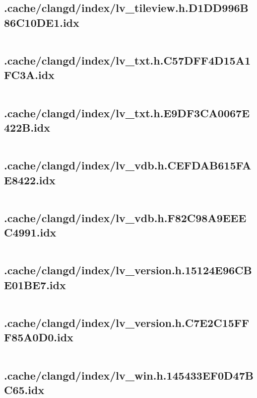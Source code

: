 \subsection{.cache/clangd/index/lv_tileview.h.D1DD996B86C10DE1.idx}
\inputminted[linenos,tabsize=2,breaklines, breakanywhere]{c}{lv_tileview.h.D1DD996B86C10DE1.idx}
\pagebreak

\subsection{.cache/clangd/index/lv_txt.h.C57DFF4D15A1FC3A.idx}
\inputminted[linenos,tabsize=2,breaklines, breakanywhere]{c}{lv_txt.h.C57DFF4D15A1FC3A.idx}
\pagebreak

\subsection{.cache/clangd/index/lv_txt.h.E9DF3CA0067E422B.idx}
\inputminted[linenos,tabsize=2,breaklines, breakanywhere]{c}{lv_txt.h.E9DF3CA0067E422B.idx}
\pagebreak

\subsection{.cache/clangd/index/lv_vdb.h.CEFDAB615FAE8422.idx}
\inputminted[linenos,tabsize=2,breaklines, breakanywhere]{c}{lv_vdb.h.CEFDAB615FAE8422.idx}
\pagebreak

\subsection{.cache/clangd/index/lv_vdb.h.F82C98A9EEEC4991.idx}
\inputminted[linenos,tabsize=2,breaklines, breakanywhere]{c}{lv_vdb.h.F82C98A9EEEC4991.idx}
\pagebreak

\subsection{.cache/clangd/index/lv_version.h.15124E96CBE01BE7.idx}
\inputminted[linenos,tabsize=2,breaklines, breakanywhere]{c}{lv_version.h.15124E96CBE01BE7.idx}
\pagebreak

\subsection{.cache/clangd/index/lv_version.h.C7E2C15FFF85A0D0.idx}
\inputminted[linenos,tabsize=2,breaklines, breakanywhere]{c}{lv_version.h.C7E2C15FFF85A0D0.idx}
\pagebreak

\subsection{.cache/clangd/index/lv_win.h.145433EF0D47BC65.idx}
\inputminted[linenos,tabsize=2,breaklines, breakanywhere]{c}{lv_win.h.145433EF0D47BC65.idx}
\pagebreak

